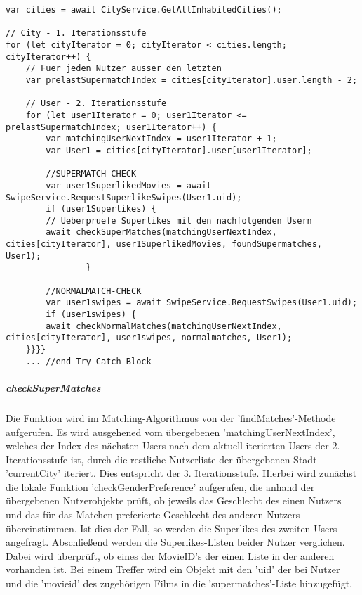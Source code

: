 \begin{lstlisting}[caption=matchManager.js - startMatching - Teil 1: Finde Matches, label=lst:findMatches]
var cities = await CityService.GetAllInhabitedCities();

// City - 1. Iterationsstufe
for (let cityIterator = 0; cityIterator < cities.length; cityIterator++) {
	// Fuer jeden Nutzer ausser den letzten
	var prelastSupermatchIndex = cities[cityIterator].user.length - 2;
           
    // User - 2. Iterationsstufe
    for (let user1Iterator = 0; user1Iterator <= prelastSupermatchIndex; user1Iterator++) {
    	var matchingUserNextIndex = user1Iterator + 1;
    	var User1 = cities[cityIterator].user[user1Iterator];
      
    	//SUPERMATCH-CHECK
    	var user1SuperlikedMovies = await SwipeService.RequestSuperlikeSwipes(User1.uid);
    	if (user1Superlikes) {
    	// Ueberpruefe Superlikes mit den nachfolgenden Usern
    	await checkSuperMatches(matchingUserNextIndex, cities[cityIterator], user1SuperlikedMovies, foundSupermatches, User1);
                }

    	//NORMALMATCH-CHECK
    	var user1swipes = await SwipeService.RequestSwipes(User1.uid);
    	if (user1swipes) {
    	await checkNormalMatches(matchingUserNextIndex, cities[cityIterator], user1swipes, normalmatches, User1);
    }}}}
    ... //end Try-Catch-Block
\end{lstlisting}

\noindent
\subparagraph{checkSuperMatches} Die Funktion wird im Matching-Algorithmus von der 'findMatches'-Methode aufgerufen. Es wird ausgehened vom übergebenen 'matchingUserNextIndex', welches der Index des nächsten Users nach dem aktuell iterierten Users der 2. Iterationsstufe ist, durch die restliche Nutzerliste der übergebenen Stadt 'currentCity' iteriert. Dies entspricht der 3. Iterationsstufe.
Hierbei wird zunächst die lokale Funktion 'checkGenderPreference' aufgerufen, die anhand der übergebenen Nutzerobjekte prüft, ob jeweils das Geschlecht des einen Nutzers und das für das Matchen preferierte Geschlecht des anderen Nutzers übereinstimmen. Ist dies der Fall, so werden die Superlikes des zweiten Users angefragt. Abschließend werden die Superlikes-Listen beider Nutzer verglichen. Dabei wird überprüft, ob eines der MovieID's der einen Liste in der anderen vorhanden ist. Bei einem Treffer wird ein Objekt mit den 'uid' der bei Nutzer und die 'movieid' des zugehörigen Films in die 'supermatches'-Liste hinzugefügt. 


